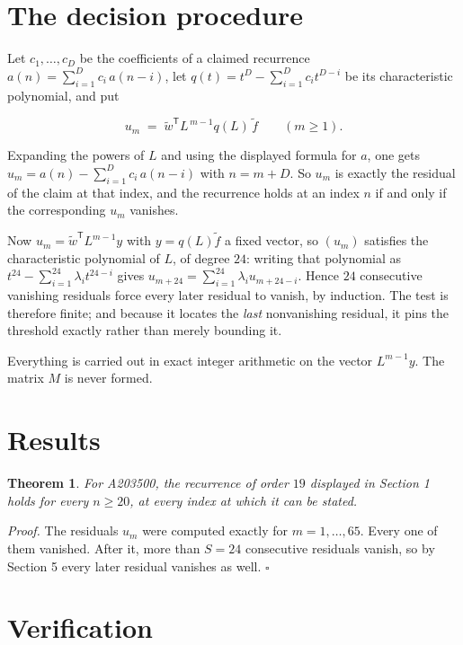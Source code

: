 \documentclass[11pt]{article}
\newtheorem{theorem}{Theorem}
\theoremstyle{definition}
\begin{document}
\section{The decision procedure}

Let $c_1,\dots,c_D$ be the coefficients of a claimed recurrence $a(n) = \sum_{i=1}^{D} c_i\,a(n-i)$, let $q(t) = t^{D} - \sum_{i=1}^{D} c_i t^{D-i}$ be its characteristic polynomial, and put

\[u_m \;=\; \tilde w^{\mathsf T} L^{\,m-1} q(L)\,\tilde f \qquad (m \ge 1).\]

Expanding the powers of $L$ and using the displayed formula for $a$, one gets $u_m = a(n) - \sum_{i=1}^{D} c_i\,a(n-i)$ with $n = m + D$. So $u_m$ is exactly the residual of the claim at that index, and the recurrence holds at an index $n$ if and only if the corresponding $u_m$ vanishes.

Now $u_m = \tilde w^{\mathsf T} L^{m-1} y$ with $y = q(L)\tilde f$ a fixed vector, so $(u_m)$ satisfies the characteristic polynomial of $L$, of degree $24$: writing that polynomial as $t^{24} - \sum_{i=1}^{24} \lambda_i t^{24-i}$ gives $u_{m+24} = \sum_{i=1}^{24} \lambda_i u_{m+24-i}$. Hence $24$ consecutive vanishing residuals force every later residual to vanish, by induction. The test is therefore finite; and because it locates the {\itshape last} nonvanishing residual, it pins the threshold exactly rather than merely bounding it.

Everything is carried out in exact integer arithmetic on the vector $L^{m-1}y$. The matrix $M$ is never formed.

\section{Results}

\begin{theorem} For A203500, the recurrence of order $19$ displayed in Section 1 holds for every $n \ge 20$, at every index at which it can be stated.\end{theorem}

{\itshape Proof.} The residuals $u_m$ were computed exactly for $m = 1,\dots,65$. Every one of them vanished. After it, more than $S = 24$ consecutive residuals vanish, so by Section 5 every later residual vanishes as well. $\square$

\section{Verification}
\end{document}
